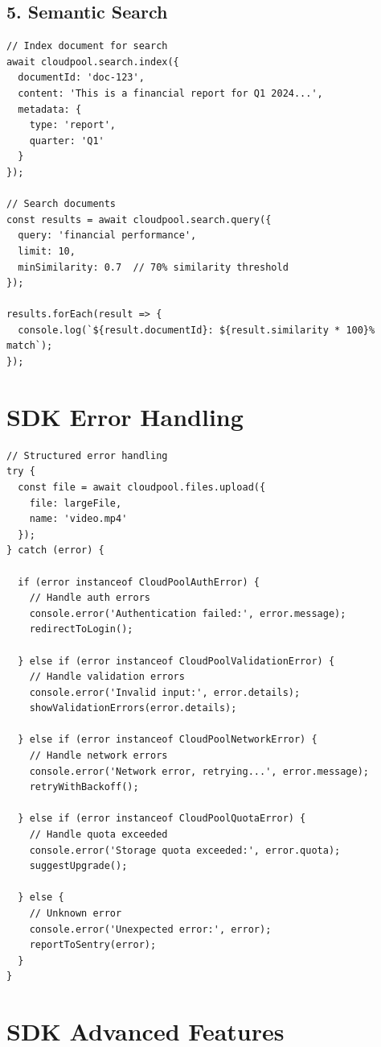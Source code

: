 \documentclass[11pt,a4paper]{report}
\begin{document}
\section{5. Semantic Search}


\begin{lstlisting}[language=text]
// Index document for search
await cloudpool.search.index({
  documentId: 'doc-123',
  content: 'This is a financial report for Q1 2024...',
  metadata: {
    type: 'report',
    quarter: 'Q1'
  }
});

// Search documents
const results = await cloudpool.search.query({
  query: 'financial performance',
  limit: 10,
  minSimilarity: 0.7  // 70% similarity threshold
});

results.forEach(result => {
  console.log(`${result.documentId}: ${result.similarity * 100}% match`);
});
\end{lstlisting}


\chapter{SDK Error Handling}


\begin{lstlisting}[language=text]
// Structured error handling
try {
  const file = await cloudpool.files.upload({
    file: largeFile,
    name: 'video.mp4'
  });
} catch (error) {
  
  if (error instanceof CloudPoolAuthError) {
    // Handle auth errors
    console.error('Authentication failed:', error.message);
    redirectToLogin();
    
  } else if (error instanceof CloudPoolValidationError) {
    // Handle validation errors
    console.error('Invalid input:', error.details);
    showValidationErrors(error.details);
    
  } else if (error instanceof CloudPoolNetworkError) {
    // Handle network errors
    console.error('Network error, retrying...', error.message);
    retryWithBackoff();
    
  } else if (error instanceof CloudPoolQuotaError) {
    // Handle quota exceeded
    console.error('Storage quota exceeded:', error.quota);
    suggestUpgrade();
    
  } else {
    // Unknown error
    console.error('Unexpected error:', error);
    reportToSentry(error);
  }
}
\end{lstlisting}


\chapter{SDK Advanced Features}
\end{document}
